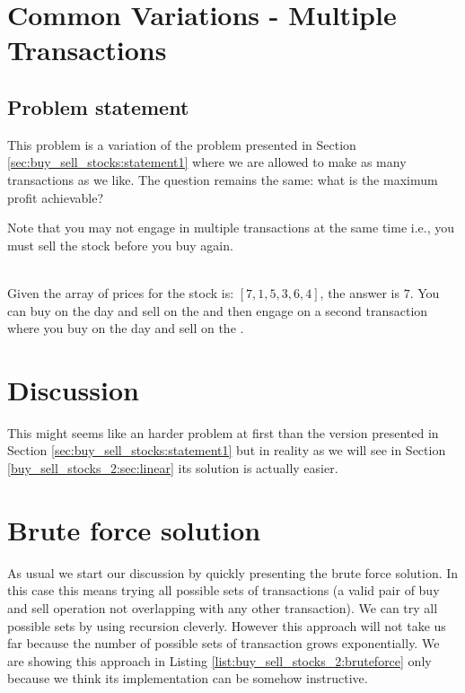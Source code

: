 \section{Common Variations - Multiple Transactions}
\label{sec:buy_sell_stocks:multiple_transaction}

\subsection{Problem statement}
\begin{exercise}
This problem is a variation of the problem presented in Section \ref{sec:buy_sell_stocks:statement1} where we are allowed to make as many transactions as we like. The question remains the same: what is the maximum profit achievable?

Note that you may not engage in multiple transactions at the same time i.e., you must sell the stock before you buy again.

	\begin{example}
	\label{ex:buy_sell_stocks_2:exmaple1}
		\hfill \\
		Given the array of prices for the stock is: $[7,1,5,3,6,4]$, the answer is $7$. 
		You can buy on the  day and sell on the  and then engage on a second transaction where you buy on the  day and sell on the .
	\end{example}

\end{exercise}


\section{Discussion}
\label{buy_sell_stocks_2:sec:discussion}
This might seems like an harder problem at first than the version presented in Section \ref{sec:buy_sell_stocks:statement1} but in reality as we will see in Section \ref{buy_sell_stocks_2:sec:linear} its solution is actually easier.

\section{Brute force solution}
\label{buy_sell_stocks_2:sec:bruteforce}
As usual we start our discussion by quickly presenting the brute force solution. In this case this means trying all possible sets of transactions (a valid pair of buy and sell operation not overlapping with any other transaction). We can try all possible sets by using recursion cleverly. However this approach will not take us far because the number of possible sets of transaction grows exponentially.
We are showing this approach in Listing \ref{list:buy_sell_stocks_2:bruteforce}  only because we think its implementation can be somehow instructive.

